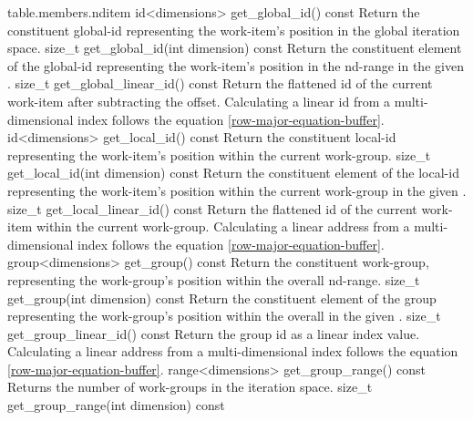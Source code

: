 {table.members.nditem}
  \addRow
    {id<dimensions> get_global_id() const}
    {
        Return the constituent \gls{global-id} representing the
        work-item's position in the global iteration space.
    }
  \addRow
    {size_t get_global_id(int dimension) const}
    {
        Return the constituent element of the \gls{global-id}
        representing the work-item's position in the \gls{nd-range}
        in the given .
    }
  \addRow
   {size_t get_global_linear_id() const}
    {
      Return the flattened \gls{id} of the current work-item after subtracting the offset.
      Calculating a linear \gls{id}
      from a multi-dimensional index follows the equation \ref{row-major-equation-buffer}.
    }
  \addRow
    {id<dimensions> get_local_id() const}
    {
        Return the constituent \gls{local-id} representing the
        work-item's position within the current \gls{work-group}.
    }
  \addRow
    {size_t get_local_id(int dimension) const}
    {
      Return the constituent element of the \gls{local-id} representing the
      work-item's position within the current \gls{work-group} in the given
      .
    }
   \addRow
    {size_t get_local_linear_id() const}
   {
      Return the flattened \gls{id} of the current work-item within the current
      \gls{work-group}.
      Calculating a linear address
      from a multi-dimensional index follows the equation \ref{row-major-equation-buffer}.
   }
  \addRow
    {group<dimensions> get_group() const}
    {
        Return the constituent \gls{work-group}, 
          representing the \gls{work-group}'s position within the overall
          \gls{nd-range}.
    }
   \addRow
    {size_t get_group(int dimension) const}
    {
        Return the constituent element of the group  representing
        the work-group's position within the overall  in the
        given .
    }
    \addRow
   {size_t get_group_linear_id() const}
    {
        Return the group id as a linear index value. Calculating a linear address
      from a multi-dimensional index follows the equation \ref{row-major-equation-buffer}.
    }
  \addRow
    {range<dimensions> get_group_range() const}
    {Returns the number of \glspl{work-group} in the iteration space.}
  \addRow
    {size_t get_group_range(int dimension) const}
